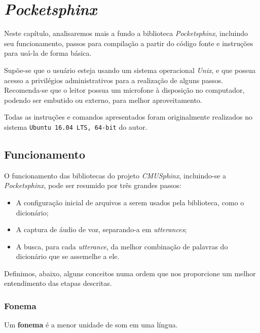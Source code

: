 \chapter{\textit{Pocketsphinx}}
\label{cap:pocketsphinx}

Neste capítulo, analisaremos mais a fundo a biblioteca \textit{Pocketsphinx}, incluindo seu funcionamento, passos para compilação a partir do código fonte e instruções para usá-la de forma básica.

Supõe-se que o usuário esteja usando um sistema operacional \textit{Unix}, e que possua acesso a privilégios administrativos para a realização de alguns passos. Recomenda-se que o leitor possua um microfone à disposição no computador, podendo ser embutido ou externo, para melhor aproveitamento.

Todas as instruções e comandos apresentados foram originalmente realizados no sistema \texttt{Ubuntu 16.04 LTS, 64-bit} do autor.


\section{Funcionamento}

O funcionamento das bibliotecas do projeto \textit{CMUSphinx}, incluindo-se a \textit{Pocketsphinx}, pode ser resumido por três grandes passos:

\begin{itemize}
\item A configuração inicial de arquivos a serem usados pela biblioteca, como o dicionário;
\item A captura de áudio de voz, separando-a em \textit{utterances};
\item A busca, para cada \textit{utterance}, da melhor combinação de palavras do dicionário que se assemelhe a ele.
\end{itemize}

Definimos, abaixo, alguns conceitos numa ordem que nos proporcione um melhor entendimento das etapas descritas.


\subsection{Fonema}

Um \textbf{fonema} é a menor unidade de som em uma língua.


